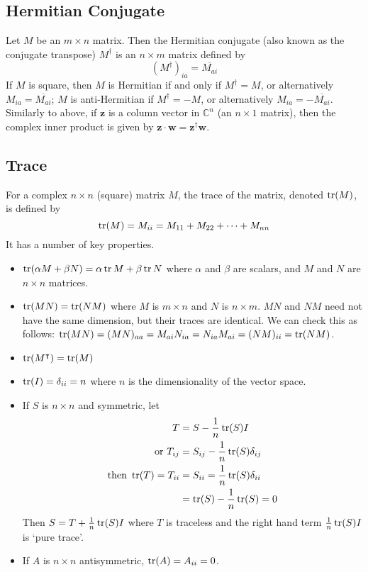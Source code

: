 \documentclass{article}
\begin{document}
	\subsection{Hermitian Conjugate}
	Let $M$ be an $m \times n$ matrix. Then the Hermitian conjugate (also known as the conjugate transpose) $M^\dagger$ is an $n \times m$ matrix defined by
	\[
		(M^\dagger)_{ia} = \overline{M_{ai}}
	\]
	If $M$ is square, then $M$ is Hermitian if and only if $M^\dagger = M$, or alternatively $M_{ia} = \overline{M_{ai}}$; $M$ is anti-Hermitian if $M^\dagger = -M$, or alternatively $M_{ia} = -\overline{M_{ai}}$. Similarly to above, if $\bm z$ is a column vector in $\mathbb C^n$ (an $n \times 1$ matrix), then the complex inner product is given by $\bm z \cdot \bm w = \bm z^\dagger \bm w$.

	\subsection{Trace}
	For a complex $n \times n$ (square) matrix $M$, the trace of the matrix, denoted $\tr(M)$, is defined by
	\[ \tr(M) = M_{ii} = M_{11} + M_{22} + \cdots + M_{nn} \]
	It has a number of key properties.
	\begin{itemize}
		\item $\tr(\alpha M + \beta N) = \alpha \tr M + \beta \tr N$ where $\alpha$ and $\beta$ are scalars, and $M$ and $N$ are $n \times n$ matrices.
		\item $\tr(MN) = \tr(NM)$ where $M$ is $m \times n$ and $N$ is $n \times m$. $MN$ and $NM$ need not have the same dimension, but their traces are identical. We can check this as follows: $\tr(MN) = (MN)_{aa} = M_{ai} N_{ia} = N_{ia} M_{ai} = (NM)_{ii} = \tr(NM)$.
		\item $\tr(M^\intercal) = \tr(M)$
		\item $\tr(I) = \delta_{ii} = n$ where $n$ is the dimensionality of the vector space.
		\item If $S$ is $n \times n$ and symmetric, let
		\begin{align*}
			T &= S - \frac{1}{n}\tr(S) I \\
			\text{or } T_{ij} &= S_{ij} - \frac{1}{n}\tr(S) \delta_{ij} \\
			\text{then } \tr (T) = T_{ii} &= S_{ii} = \frac{1}{n}\tr(S) \delta_{ii} \\
			&= \tr(S) - \frac{1}{n}\tr(S) = 0
		\end{align*}
		Then $S = T + \frac{1}{n}\tr(S)I$ where $T$ is traceless and the right hand term $\frac{1}{n}\tr(S)I$ is `pure trace'.
		\item If $A$ is $n \times n$ antisymmetric, $\tr(A) = A_{ii} = 0$.
	\end{itemize}
\end{document}
